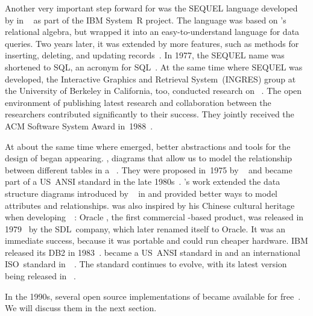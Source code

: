 Another very important step forward for  was the SEQUEL language developed by \citeauthor{CB1974SASEQL} in \citeyear{CB1974SASEQL}~\cite{CB1974SASEQL} as part of the IBM System~R project.
The language was based on \citeauthor{C1970ARMODFLSDB}'s relational algebra, but wrapped it into an easy-to-understand language for data queries.
Two years later, it was extended by more features, such as methods for inserting, deleting, and updating records~\cite{CAEGLMRB1976S2AUATDDMAC}.
In 1977, the SEQUEL name was shortened to \acrshort{SQL}, an acronym for \acrfull{SQL}~\cite{C20245YOQ}.
At the same time where SEQUEL was developed, the Interactive Graphics and Retrieval System~(INGRES) group at the University of Berkeley in California, too, conducted research on ~\cite{S1986TIPAOARDS}.
The open environment of publishing latest research and collaboration between the researchers contributed significantly to their success.
They jointly received the ACM Software System Award in~1988~\cite{C20245YOQ}.

At about the same time where  emerged, better abstractions and tools for the design of  began appearing.
, diagrams that allow us to model the relationship between different tables in a \db~\cite{KW2012ASHOTEDAIM,C1976TERMTAUVOD}.
They were proposed in~1975 by \citeauthor{C1975TRMTAUVOD}~\cite{C1975TRMTAUVOD} and became part of a US~ANSI standard in the late 1980s~\cite{GK1985ATOOTIRDS,P1992IAX1ASFIRDSI}.
's work extended the data structure diagrams introduced by \citeauthor{B1969DSD}~\cite{B1969DSD} in \citeyear{B1969DSD} and provided better ways to model attributes and relationships.
 was also inspired by his Chinese cultural heritage when developing~~\cite{C1997ECAED,C2002ERMHEFTALL}:%
%
%
%
Oracle , the first commercial -based product, was released in 1979~\cite{C20245YOQ} by the SDL~company, which later renamed itself to Oracle.
It was an immediate success, because it was portable and could run cheaper hardware.
IBM released its   DB2 in 1983~\cite{C20245YOQ,HS2013THAGOID}.
 became a US~ANSI standard in \citeyear{ANSIX3135} and an international ISO~standard in~\citeyear{ISO90751987}~\cite{ANSIX3135,ISO90751987}.
The standard continues to evolve, with its latest version being released in \citeyear{ISOIEC9707112023E}~\cite{ISOIEC9707112023E}.

In the 1990s, several open source implementations of  became available for free~\cite{C20245YOQ}.
We will discuss them in the next section.%
%
\endhsection%
%
